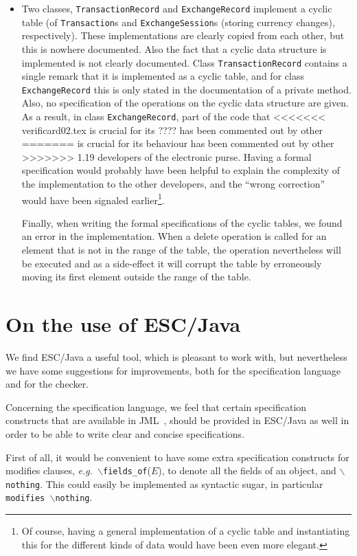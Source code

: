 \documentclass[a4paper]{llncs}
\newcommand{\noth}{\(\backslash\)\texttt{nothing}}
\newcommand{\fieldsof}{\(\backslash\)\texttt{fields\_of}}
\begin{document}
\begin{itemize}
\item Two classes, \texttt{TransactionRecord} and
\texttt{ExchangeRecord} implement a cyclic table (of
\texttt{Transaction}s and
\texttt{ExchangeSession}s (storing currency changes),
respectively).  These implementations are clearly copied from each
other, but this is nowhere documented. Also the fact that a
cyclic data structure is implemented is not clearly documented. Class
\texttt{TransactionRecord} contains a single remark that it is
implemented as a cyclic table, and for class
\texttt{ExchangeRecord} this is only stated in the documentation of a
private method. Also, no specification of the operations on the cyclic
data structure are given.
As a result, in class \texttt{ExchangeRecord}, part of the code that
<<<<<<< verificard02.tex
is crucial for its ???? has been commented out by other
=======
is crucial for its behaviour has been commented out by other
>>>>>>> 1.19
developers of the electronic purse. Having a formal specification
would probably have been helpful to explain the complexity of the
implementation to the other developers, and the ``wrong correction''
would have been signaled earlier\footnote{Of course, having a general 
implementation of a cyclic table and instantiating this for the
different kinds of data would have been even more elegant.}.

Finally, when writing the formal specifications of the cyclic tables,
we found an error in the implementation. When a delete operation is
called for an element that is not in the range of the table, the
operation nevertheless will be executed and as a side-effect it will
corrupt the table by erroneously moving its first element outside the
range of the table.
\end{itemize}

\section{On the use of ESC/Java}
\label{SectESC}
We find ESC/Java a useful tool, which is pleasant to work with, but
nevertheless we have some suggestions for improvements, both for the
specification language and for the checker.

Concerning the specification language, we feel that certain
specification constructs that are available in JML~\cite{LeavensBR00},
should be provided in ESC/Java as well in order to be able to write
clear and concise specifications. 

First of all, it would be convenient to have some extra specification
constructs for modifies clauses, \emph{e.g.}~\fieldsof(\(E\)), to denote all
the fields of an object, and \noth. This could easily be implemented
as syntactic sugar, in particular \texttt{modifies \noth}.
\end{document}
